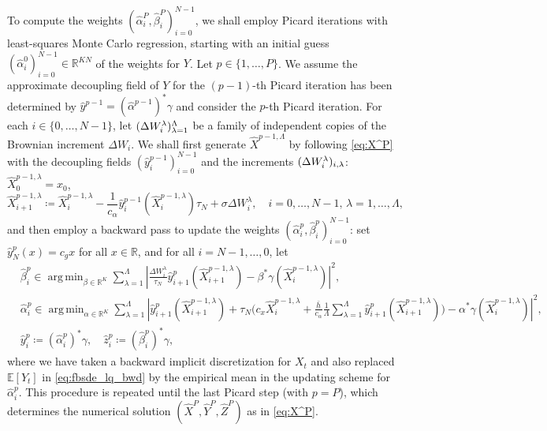 \documentclass[11pt]{article}
\numberwithin{equation}{section}
\theoremstyle{definition}
\theoremstyle{remark}
\newcommand{\q}{\quad}   \newcommand{\qq}{\qquad}
\def\l{\label}  \def\f{\frac}  \def\fa{\forall}
\def\b{\beta}  \def\a{\alpha} \def\ga{\gamma}
\def\sE{{\mathbb{E}}}
\def\sR{{\mathbb R}}
\DeclareMathOperator*{\argmin}{arg\,min}
\def\bb{\begin{equation}} \def\ee{\end{equation}}
\begin{document}
To compute the   weights
$(\hat{\a}^P_i,\hat{\b}^P_i)_{i=0}^{N-1}$, we shall employ  Picard iterations with  least-squares Monte Carlo regression,
 starting with an initial guess 
 $(\hat{\a}^{0}_i)_{i=0}^{N-1}\in \sR^{KN}$
 of the weights  for $Y$.
Let  $p\in \{1,\ldots, P\}$.
We 
assume the 
approximate decoupling field of $Y$ for the $(p-1)$-th Picard iteration 
has been determined by $\hat{y}^{p-1}=( \hat{\a}^{p-1})^*\gamma$
and
 consider the $p$-th Picard iteration.  
For each $i\in \{0,\ldots, N-1\}$,
let 
$(\Delta W_{i}^{\lambda})_{\lambda=1}^\Lambda$
be a  family of independent copies of the Brownian increment $\Delta W_{i}$.
We shall first generate 
$\hat{X}^{p-1,\Lambda}$ by 
following \eqref{eq:X^P}
with 
the decoupling fields
$(\hat{y}^{p-1}_i)_{i=0}^{N-1}$ and 
the increments
$(\Delta W_{i}^{\lambda})_{i,\lambda}$:
$\hat{X}^{p-1,\lambda}_0=x_0$,
\bb\l{eq:X^P-1}
\hat{X}^{p-1,\lambda}_{i+1} \coloneqq \hat{X}^{p-1,\lambda}_i -\frac{1}{c_{\alpha}} \hat{y}^{p-1}_i(\hat{X}^{p-1,\lambda}_i)\tau_N + \sigma \Delta W^\lambda_i,
\q i=0,\ldots, N-1,\,
\lambda=1,\ldots, \Lambda,
\ee 
and then employ  a backward pass to update the weights 
$(\hat{\a}^{p}_i,\hat{\b}^{p}_i)_{i=0}^{N-1}$:
set $ \hat{y}^p_N(x)=c_gx$ for all $x\in \sR$, and for all $i=N-1,\ldots, 0$, let
\begin{align*}%
& \hat{\b}^p_i \in \argmin_{ \b \in \mathbb{R}^K} \sum_{\lambda = 1}^{\Lambda} \left | \frac{\Delta W^{\lambda}_{i}}{\tau_N} \hat{y}^{p}_{i+1}(\hat{X}^{p-1,\lambda}_{i+1}) - \b^*\gamma(\hat{X}^{p-1,\lambda}_{i})  \right |^2, \nonumber \\
&\hat{ \alpha}^p_i \in  
\argmin_{ \alpha \in \mathbb{R}^K} \sum_{\lambda = 1}^{\Lambda} \left |\hat{y}^{p}_{i+1}(\hat{X}^{p-1,\lambda}_{i+1}) 
+ \tau_N
\bigg(
c_x \hat{X}^{p-1,\lambda}_{i}
+\frac{\bar{h}}{c_{\alpha}} 
\frac{1}{\Lambda}\sum_{\lambda=1}^\Lambda
\hat{y}^{p}_{i+1}(\hat{X}^{p-1,\lambda}_{i+1})
\bigg)
%
 - \alpha^*\gamma(\hat{X}^{p-1,\lambda}_{i})  \right |^2, \nonumber \\
& \hat{y}^{p}_i \coloneqq (\hat{ \alpha}^p_i)^*\gamma,\q 
 \hat{z}^{p}_{i}\coloneqq (\hat{\b}^p_i)^*\gamma, 
\end{align*}
 where 
we have taken  
a backward implicit discretization for  $X_t$
and also
replaced $\sE[Y_t]$ in \eqref{eq:fbsde_lq_bwd}
by the empirical mean
 in the updating scheme for $ \hat{ \alpha}^p_i$.
This procedure is repeated until the last Picard step (with $p=P$),
which determines the numerical solution 
$(\hat{X}^P,\hat{Y}^P,\hat{Z}^P)$ as  in \eqref{eq:X^P}.
\end{document}
